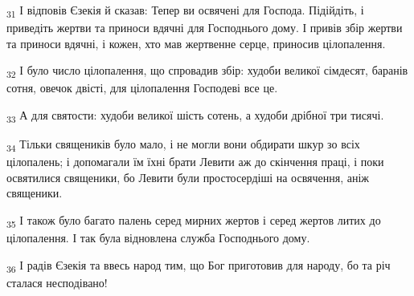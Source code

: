 \begin{tcolorbox}
\textsubscript{31} І відповів Єзекія й сказав: Тепер ви освячені для Господа. Підійдіть, і приведіть жертви та приноси вдячні для Господнього дому. І привів збір жертви та приноси вдячні, і кожен, хто мав жертвенне серце, приносив цілопалення.
\end{tcolorbox}
\begin{tcolorbox}
\textsubscript{32} І було число цілопалення, що спровадив збір: худоби великої сімдесят, баранів сотня, овечок двісті, для цілопалення Господеві все це.
\end{tcolorbox}
\begin{tcolorbox}
\textsubscript{33} А для святости: худоби великої шість сотень, а худоби дрібної три тисячі.
\end{tcolorbox}
\begin{tcolorbox}
\textsubscript{34} Тільки священиків було мало, і не могли вони обдирати шкур зо всіх цілопалень; і допомагали їм їхні брати Левити аж до скінчення праці, і поки освятилися священики, бо Левити були простосердіші на освячення, аніж священики.
\end{tcolorbox}
\begin{tcolorbox}
\textsubscript{35} І також було багато палень серед мирних жертов і серед жертов литих до цілопалення. І так була відновлена служба Господнього дому.
\end{tcolorbox}
\begin{tcolorbox}
\textsubscript{36} І радів Єзекія та ввесь народ тим, що Бог приготовив для народу, бо та річ сталася несподівано!
\end{tcolorbox}
